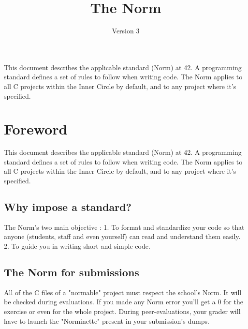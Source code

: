 \documentclass{42-en}
\begin{document}
\title{The Norm}
\subtitle{Version 3}

\summary
{
    This document describes the applicable standard (Norm) at 42. A
    programming standard defines a set of rules to follow when writing code.
    The Norm applies to all C projects within the Inner Circle by default, and
    to any project where it's specified.
}

\maketitle

\tableofcontents



\chapter{Foreword}

    This document describes the applicable standard (Norm) at 42. A
    programming standard defines a set of rules to follow when writing code.
    The Norm applies to all C projects within the Inner Circle by default, and
    to any project where it's specified.


    \section{Why impose a standard?}

        The Norm's two main objective :
        1. To format and standardize your code so that anyone (students,
        staff and even yourself) can read and understand them easily.
        2. To guide you in writing short and simple code.

    \section{The Norm for submissions}

        All of the C files of a "normable" project must respect the school's Norm. It will be
        checked during evaluations. If you made any Norm error you'll get
        a 0 for the exercise or even for the whole project. During
        peer-evaluations, your grader will have to launch the "Norminette"
        present in your submission's dumps.
\end{document}
